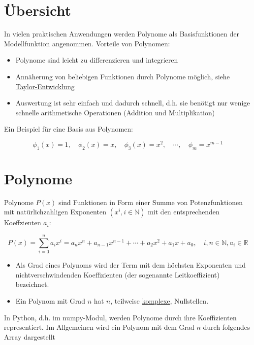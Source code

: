 \documentclass[
  letterpaper,
  DIV=11,
  numbers=noendperiod]{scrreprt}
\providecommand{\tightlist}{%
  \setlength{\itemsep}{0pt}\setlength{\parskip}{0pt}}\usepackage{longtable,booktabs,array}
\begin{document}
\section{Übersicht}\label{uxfcbersicht-1}

In vielen praktischen Anwendungen werden Polynome als Basisfunktionen
der Modellfunktion angenommen. Vorteile von Polynomen:

\begin{itemize}
\tightlist
\item
  Polynome sind leicht zu differenzieren und integrieren
\item
  Annäherung von beliebigen Funktionen durch Polynome möglich, siehe
  \href{https://de.wikipedia.org/wiki/Taylorreihe}{Taylor-Entwicklung}
\item
  Auswertung ist sehr einfach und dadurch schnell, d.h. sie benötigt nur
  wenige schnelle arithmetische Operationen (Addition und
  Multiplikation)
\end{itemize}

Ein Beispiel für eine Basis aus Polynomen:

\[ \phi_1(x)=1,\quad \phi_2(x)=x,\quad \phi_3(x)=x^2,\quad \cdots,\quad \phi_m =x^{m-1} \]

\section{Polynome}\label{polynome}

Polynome \(P(x)\) sind Funktionen in Form einer Summe von
Potenzfunktionen mit natürlichzahligen Exponenten
\(( x^i, i \in \mathbb{N})\) mit den entsprechenden Koeffzienten
\(a_i\):

\[ P(x) = \sum_{i=0}^n a_i x^i = a_n x^n + a_{n-1} x^{n-1} + \cdots + a_2 x^2 + a_1 x + a_0, \quad i, n \in \mathbb{N}, a_i \in \mathbb{R} \]

\begin{itemize}
\tightlist
\item
  Als Grad eines Polynoms wird der Term mit dem höchsten Exponenten und
  nichtverschwindenden Koeffizienten (der sogenannte Leitkoeffizient)
  bezeichnet.
\item
  Ein Polynom mit Grad \(n\) hat \(n\), teilweise
  \href{https://de.wikipedia.org/wiki/Komplexe_Zahl}{komplexe},
  Nullstellen.
\end{itemize}

In Python, d.h. im numpy-Modul, werden Polynome durch ihre Koeffizienten
representiert. Im Allgemeinen wird ein Polynom mit dem Grad \(n\) durch
folgendes Array dargestellt
\end{document}
